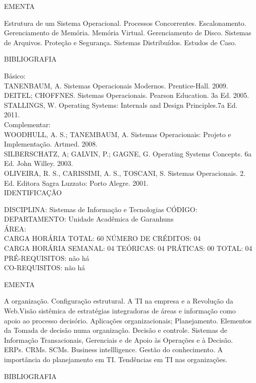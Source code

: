 \documentclass[
	12pt,				%
	openright,			%
  oneside,     %
	a4paper,			%
	english,			%
	french,				%
	spanish,			%
	brazil				%
	]{abntex2}
\begin{document}
\begin{apendicesenv}
EMENTA 

Estrutura de um Sistema Operacional. Processos Concorrentes.
Escalonamento. Gerenciamento de Memória. Memória Virtual. Gerenciamento
de Disco. Sistemas de Arquivos. Proteção e Segurança. Sistemas
Distribuídos. Estudos de Caso.

BIBLIOGRAFIA 

Básico:\\
TANENBAUM, A. Sistemas Operacionais Modernos. Prentice-Hall. 2009.\\
DEITEL; CHOFFNES. Sistemas Operacionais. Pearson Education. 3a Ed.
2005.\\
STALLINGS, W. Operating Systems: Internals and Design Principles.7a Ed.
2011.\\
Complementar:\\
WOODHULL, A. S.; TANEMBAUM, A. Sistemas Operacionais: Projeto e
Implementação. Artmed. 2008.\\
SILBERSCHATZ, A; GALVIN, P.; GAGNE, G. Operating Systems Concepts. 6a
Ed. John Willey. 2003.\\
OLIVEIRA, R. S., CARISSIMI, A. S., TOSCANI, S. Sistemas Operacionais. 2.
Ed. Editora Sagra Luzzato: Porto Alegre. 2001.\\


\newpage IDENTIFICAÇÃO

DISCIPLINA: Sistemas de Informação e Tecnologias CÓDIGO:\\ 
DEPARTAMENTO: Unidade Acadêmica de Garanhuns\\
ÁREA:\\
CARGA HORÁRIA TOTAL: 60 NÚMERO DE CRÉDITOS: 04\\
CARGA HORÁRIA SEMANAL: 04 TEÓRICAS: 04 PRÁTICAS: 00 TOTAL: 04\\
PRÉ-REQUISITOS: não há\\
CO-REQUISITOS: não há

EMENTA 

A organização. Configuração estrutural. A TI na empresa e a Revolução da
Web.Visão sistêmica de estratégias integradoras de áreas e informação
como apoio ao processo decisório. Aplicações organizacionais;
Planejamento. Elementos da Tomada de decisão numa organização. Decisão
e controle. Sistemas de Informação Transacionais, Gerenciais e de Apoio
às Operações e à Decisão. ERPs. CRMs. SCMs. Business intellligence.
Gestão do conhecimento. A importância do planejamento em TI. Tendências
em TI nas organizações.

BIBLIOGRAFIA 


\end{apendicesenv}
\end{document}
